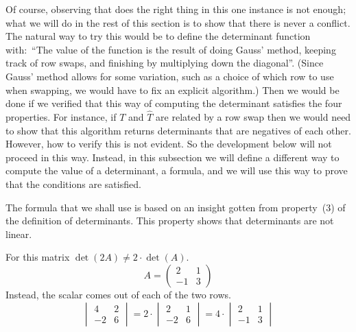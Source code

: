 Of course, observing that  does the right thing
in this one instance is not enough; what we will do in the rest of this 
section is to show that there is never a conflict.
The natural way to try this would be 
to define the determinant function with:~``The value of the
function is the result of doing Gauss' method,
keeping track of row swaps, and finishing by multiplying down the diagonal''. 
(Since Gauss' method allows for some variation, such as a  
choice of which row to use when swapping, 
we would have to fix an explicit algorithm.)
Then we would be done if we verified that 
this way of computing the determinant satisfies the four properties.
For instance, if $T$ and $\hat{T}$ 
are related by a row swap then we would need to show that this
algorithm returns determinants that are negatives of each other.
However, how to verify this is not evident.
So the development below will not proceed in this way.
Instead, in this subsection we will define a different way to compute
the value of a determinant, a formula, and we will use this way to 
prove that the conditions are satisfied.

The formula that we shall use is based on an insight gotten from  
property~(3) of the definition of determinants.
This property shows that determinants are not linear.

\begin{example}
For this matrix
\( \det(2A)\neq 2\cdot\det(A) \).
\begin{equation*}
   A=\begin{pmatrix}
       2  &1  \\
      -1  &3
     \end{pmatrix}
\end{equation*} 
Instead, the scalar comes out of each of the two rows.
\begin{equation*}
   \begin{vmatrix}
       4  &2  \\
      -2  &6
     \end{vmatrix}
  =2\cdot\begin{vmatrix}
       2  &1  \\
      -2  &6
     \end{vmatrix}
  =4\cdot\begin{vmatrix}
       2  &1  \\
      -1  &3
     \end{vmatrix}
\end{equation*}
\end{example}


